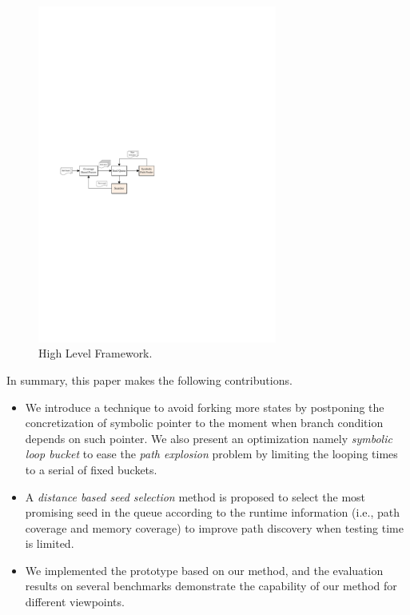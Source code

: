 \begin{figure}
\begin{center}
\includegraphics[width=0.7\textwidth]{figures/framework.pdf} 
\caption{High Level Framework.}\label{Framework}
\end{center}
\end{figure}

In summary, this paper makes the following contributions.
\begin{itemize}
\item We introduce a technique to avoid forking more states by postponing the concretization of symbolic pointer to the moment when branch condition depends on such pointer.  
 We also present an optimization namely \emph{symbolic loop bucket} to ease the \textit{path explosion} problem by limiting the looping times to a serial of fixed buckets.

\item A \emph{distance based seed selection} method is proposed to select the most promising seed 
 in the queue according to the runtime information (i.e., path coverage and memory coverage) to improve path discovery when testing time is limited. 

\item We implemented the prototype based on our method, 
 and the evaluation results on several benchmarks demonstrate the capability of our method for different viewpoints.
\end{itemize}


